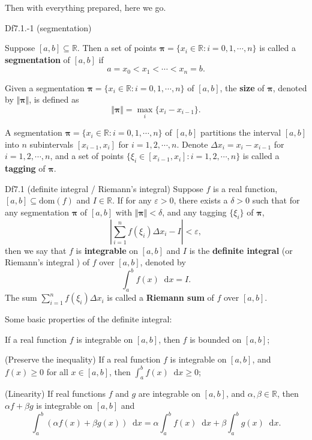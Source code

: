\documentclass{article}
\newcommand{\dif}{\mathop{}\!\mathrm{d}}
\begin{document}
Then with everything prepared, here we go. 

\begin{Df}{Df7.1.-1 (segmentation)}
    \begin{compactenum}
        \item Suppose $[a, b]\subseteq\mathbb{R}$. Then a set of points $\pmb{\pi} = \{x_i\in\mathbb{R}: i = 0,1,\cdots,n\}$ is called a \textbf{segmentation} of $[a, b]$ if
            $$a = x_0 < x_1 < \cdots < x_n = b.$$ 
        \item Given a segmentation $\pmb{\pi} = \{x_i\in\mathbb{R}: i = 0,1,\cdots,n\}$ of $[a, b]$, the \textbf{size} of $\pmb{\pi}$, denoted by $\Vert \pmb{\pi}\Vert$, is defined as
            $$ \Vert \pmb{\pi}\Vert = \max_i\{x_i - x_{i-1}\}. $$
        \item A segmentation $\pmb{\pi} = \{x_i\in\mathbb{R}: i = 0,1,\cdots,n\}$ of $[a, b]$ partitions the interval $[a, b]$ into $n$ subintervals $[x_{i-1}, x_i]$ for $i = 1,2,\cdots,n$. Denote $\Delta x_i = x_i - x_{i-1}$ for $i = 1,2,\cdots,n$, and a set of points $\{\xi_i\in[x_{i-1}, x_i]: i = 1,2,\cdots,n\}$ is called a \textbf{tagging} of $\pmb{\pi}$.
    \end{compactenum}
\end{Df}

\begin{Df}{Df7.1 (definite integral / Riemann's integral)}
    Suppose $f$ is a real function, $[a, b]\subseteq \text{dom}(f)$ and $I\in\mathbb{R}$. If for any $\varepsilon>0$, there exists a $\delta>0$ such that for any segmentation $\pmb{\pi}$ of $[a, b]$ with $\Vert \pmb{\pi}\Vert < \delta$, and any tagging $\{\xi_i\}$ of $\pmb{\pi}$, 
    $$\left| \sum_{i=1}^n f(\xi_i)\Delta x_i - I \right| < \varepsilon,$$
    then we say that $f$ is \textbf{integrable} on $[a, b]$ and $I$ is the \textbf{definite integral} (or Riemann's integral ) of $f$ over $[a, b]$, denoted by
    $$\int_a^b f(x)\dif x = I.$$
    The sum $\sum_{i=1}^n f(\xi_i)\Delta x_i$ is called a \textbf{Riemann sum} of $f$ over $[a, b]$.
\end{Df}

\begin{Rmk}{}
    Some basic properties of the definite integral:
    \begin{compactenum}
        \item If a real function $f$ is integrable on $[a, b]$, then $f$ is bounded on $[a, b]$;
        \item (Preserve the inequality) If a real function $f$ is integrable on $[a, b]$, and $f(x)\geq 0$ for all $x\in[a, b]$, then $\int_a^b f(x)\dif x \geq 0$;
        \item (Linearity) If real functions $f$ and $g$ are integrable on $[a, b]$, and $\alpha, \beta\in\mathbb{R}$, then $\alpha f + \beta g$ is integrable on $[a, b]$ and
            $$\int_a^b \left(\alpha f(x) + \beta g(x)\right)\dif x = \alpha\int_a^b f(x)\dif x + \beta\int_a^b g(x)\dif x.$$
    \end{compactenum}
\end{Rmk}
\end{document}
